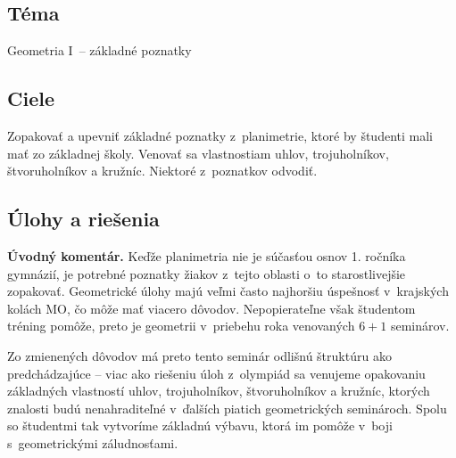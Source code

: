 
\subsection*{Téma}
Geometria I~-- základné poznatky
\subsection*{Ciele}
Zopakovať a upevniť základné poznatky z~planimetrie, ktoré by študenti mali mať zo základnej školy. Venovať sa vlastnostiam uhlov, trojuholníkov, štvoruholníkov a kružníc. Niektoré z~poznatkov odvodiť.

\subsection*{Úlohy a riešenia}

\textbf{Úvodný komentár.} Keďže planimetria nie je súčasťou osnov 1. ročníka gymnázií, je potrebné poznatky žiakov z~tejto oblasti o~to starostlivejšie zopakovať. Geometrické úlohy majú veľmi často najhoršiu úspešnosť v~krajských kolách MO, čo môže mať viacero dôvodov. Nepopierateľne však študentom tréning pomôže, preto je geometrii v~priebehu roka venovaných $6+1$ seminárov.

Zo zmienených dôvodov má preto tento seminár odlišnú štruktúru ako predchádzajúce -- viac ako riešeniu úloh z~olympiád sa venujeme opakovaniu základných vlastností uhlov, trojuholníkov, štvoruholníkov a kružníc, ktorých znalosti budú nenahraditeľné v~ďalších piatich geometrických seminároch. Spolu so študentmi tak vytvoríme základnú výbavu, ktorá im pomôže v~boji s~geometrickými záludnosťami.

